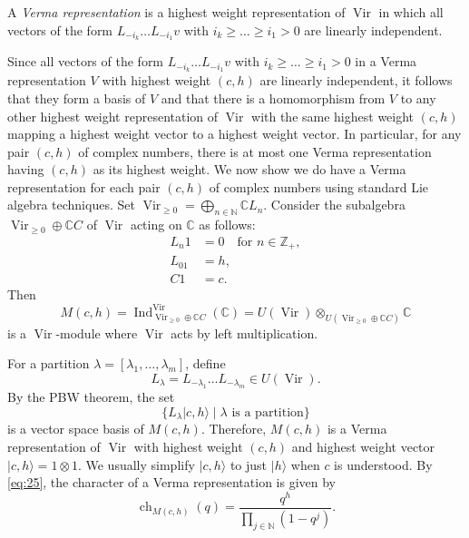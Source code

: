 \documentclass[a4paper, 12pt, reqno]{amsart}
\theoremstyle{remark}
\numberwithin{equation}{subsection}
\DeclareMathOperator{\Vir}{Vir}
\DeclareMathOperator{\ch}{ch}
\DeclareMathOperator{\Ind}{Ind}
\begin{document}
A \emph{Verma representation} is a highest weight representation of $\Vir$ in which all vectors of the form $L_{-i_k}\dots L_{-i_1}v$ with $i_k \ge \dots \ge i_1 > 0$ are linearly independent.

Since all vectors of the form $L_{-i_k}\dots L_{-i_1}v$ with $i_k \ge \dots \ge i_1 > 0$ in a Verma representation $V$ with highest weight $(c, h)$ are linearly independent, it follows that they form a basis of $V$ and that there is a homomorphism from $V$ to any other highest weight representation of $\Vir$ with the same highest weight $(c, h)$ mapping a highest weight vector to a highest weight vector.
In particular, for any pair $(c, h)$ of complex numbers, there is at most one Verma representation having $(c, h)$ as its highest weight.
We now show we do have a Verma representation for each pair $(c, h)$ of complex numbers using standard Lie algebra techniques.
Set $\Vir_{\ge 0} = \bigoplus_{n \in \mathbb{N}}\mathbb{C}L_n$.
Consider the subalgebra $\Vir_{\ge 0} \oplus \mathbb{C}C$ of $\Vir$ acting on $\mathbb{C}$ as follows:
\begin{align*}
  L_n1 &= 0 \quad \text{for }n \in \mathbb{Z}_+, \\
  L_01 &= h, \\
  C1 &= c.
\end{align*}
Then
\begin{equation*}
  M(c, h) = \Ind^{\Vir}_{\Vir_{\ge 0} \oplus \mathbb{C}C}(\mathbb{C}) = U(\Vir) \otimes_{U(\Vir_{\ge 0} \oplus \mathbb{C}C)} \mathbb{C}
\end{equation*}
is a $\Vir$-module where $\Vir$ acts by left multiplication.

For a partition $\lambda = [\lambda_1, \dots, \lambda_m]$, define
\begin{equation*}
  L_{\lambda} = L_{-\lambda_1}\dots L_{-\lambda_m} \in U(\Vir).
\end{equation*}
By the PBW theorem, the set
\begin{equation*}
  \{L_{\lambda}|c,h\rangle \mid \lambda\text{ is a partition}\}
\end{equation*}
is a vector space basis of $M(c, h)$.
Therefore, $M(c, h)$ is a Verma representation of $\Vir$ with highest weight $(c, h)$ and highest weight vector $|c, h\rangle = 1\otimes1$.
We usually simplify $|c, h\rangle$ to just $|h\rangle$ when $c$ is understood.
By \eqref{eq:25}, the character of a Verma representation is given by
\begin{equation*}
  \ch_{M(c, h)}(q) = \frac{q^h}{\prod_{j \in \mathbb{N}}(1 - q^j)}.
\end{equation*}
\end{document}
